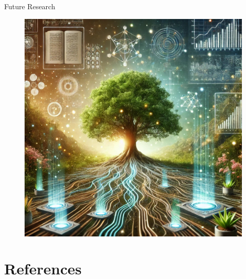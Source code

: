 \documentclass[aspectratio=169,xcolor=dvipsnames,t]{beamer}
\begin{document}

\begin{frame}{Future Research}
\begin{figure}
    \centering
    \includegraphics[width=0.5\linewidth]{tree-swap.png}
    \label{fig:enter-label}
\end{figure}
\end{frame}

\section{References}
\end{document}
